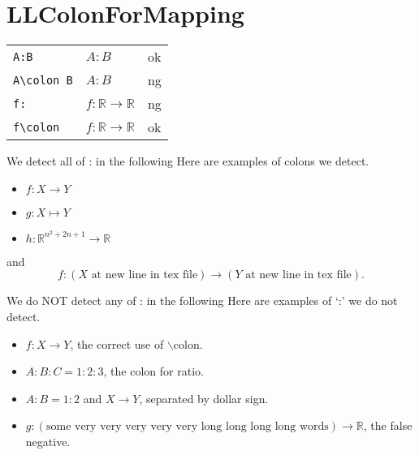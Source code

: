 \documentclass[a4paper]{article}
\newcommand{\tA}[1]{\textcolor{cA}{#1}}
\newcommand{\tD}[1]{\textcolor{cD}{#1}}
\begin{document}
\section{LLColonForMapping}

\begin{table}[H]
	\centering
	\begin{tabular}{lll}
		\verb|A:B|       & $A:B$                               & \tA{ok} \\
		\verb|A\colon B| & $A\colon B$                         & \tD{ng} \\
		\verb|f:|        & $f:\mathbb{R} \to \mathbb{R}$       & \tD{ng} \\
		\verb|f\colon|   & $f\colon \mathbb{R} \to \mathbb{R}$ & \tA{ok}
	\end{tabular}
\end{table}

\begin{itembox}{We detect all of : in the following}
	Here are examples of colons we detect.
	\begin{itemize}
		\item $f:X \to Y$
		\item \( g: X \mapsto Y \)
		\item $h : \mathbb{R}^{n^2 + 2n + 1} \rightarrow \mathbb{R}$
	\end{itemize}
	and
	\begin{equation} \label{eq:sample}
		f:
		(X \text{ at new line in tex file})
		\to
		(Y \text{ at new line in tex file}).
	\end{equation}
\end{itembox}

\vspace{\baselineskip}

\begin{itembox}{We do NOT detect any of : in the following}
	Here are examples of `:' we do not detect.
	\begin{itemize}
		\item $f\colon X \to Y$, the correct use of $\backslash$colon.
		\item $A:B:C = 1:2:3$, the colon for ratio.
		\item $A:B = 1:2$ and $X \to Y$, separated by dollar sign.
		\item $g: (\text{some very very very very very long long long long words}) \to \mathbb{R}$, the false negative.
	\end{itemize}
\end{itembox}
\end{document}
